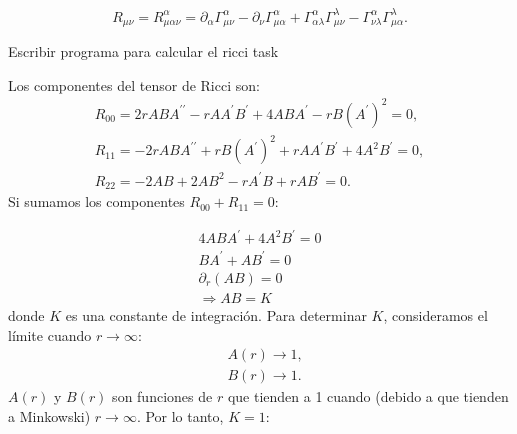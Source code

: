 \begin{equation}
    R_{\mu \nu}=R_{\mu \alpha \nu}^\alpha=\partial_\alpha \Gamma_{\mu \nu}^\alpha-\partial_\nu \Gamma_{\mu \alpha}^\alpha+\Gamma_{\alpha \lambda}^\alpha \Gamma_{\mu \nu}^\lambda-\Gamma_{\nu \lambda}^\alpha \Gamma_{\mu \alpha}^\lambda .
\end{equation}

\begin{task}{Escribir programa para calcular el ricci}{}
    task
\end{task}
Los componentes del tensor de Ricci son:
\begin{equation}
    \begin{array}{l}
    R_{00}=2 r A B A^{\prime \prime}-r A A^{\prime} B^{\prime}+4 A B A^{\prime}-r B\left(A^{\prime}\right)^2=0 ,\\
    R_{11}=-2 r A B A^{\prime \prime}+r B\left(A^{\prime}\right)^2+r A A^{\prime} B^{\prime}+4 A^2 B^{\prime}=0, \\
    R_{22}=-2 A B+2 A B^2-r A^{\prime} B+r A B^{\prime}=0.
    \end{array}
    \end{equation}
Si sumamos los componentes $R_{00} + R_{11} = 0 $:

\begin{equation}
    \begin{aligned}
        4 A B A^{\prime} + 4 A^2 B^{\prime} = 0 \\
        B A^{\prime}+A B^{\prime}=0 \\
        \partial_r(A B)=0 \\
        \Rightarrow A B=K
    \end{aligned}
\end{equation}
donde \( K \) es una constante de integración. Para determinar \( K \), consideramos el límite cuando \( r \to \infty \):
\begin{equation}
    \begin{aligned}
         & A(r) \rightarrow 1, \\
         & B(r) \rightarrow 1.
    \end{aligned}
\end{equation}
$A(r)$ y $B(r)$ son funciones de \( r \) que tienden a 1 cuando (debido a que tienden a Minkowski)  \( r \to \infty \). Por lo tanto, \( K = 1 \):

